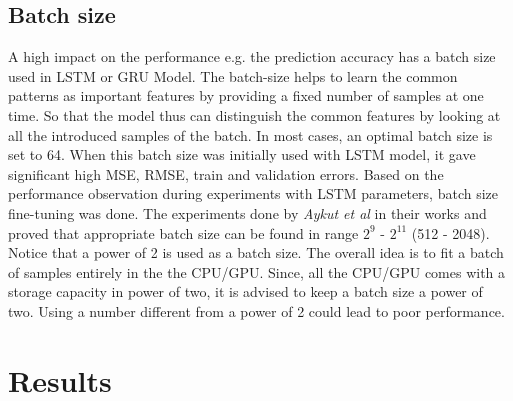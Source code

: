 \subsection{Batch size}
\label{sec:imp:experiments:batch}
A high impact on the performance e.g. the prediction accuracy has a batch size used in LSTM or GRU Model. The batch-size helps to learn the common patterns as important features by providing a fixed number of samples at one time. So that the model thus can distinguish the common features by looking at all the introduced samples of the batch. In most cases, an optimal batch size is set to 64. When this batch size was initially used with LSTM model, it gave significant high MSE, RMSE, train and validation errors. Based on the performance observation during experiments with LSTM parameters, batch size fine-tuning was done. The experiments done by \textit{Aykut et al} in their works \cite{delay_compensation_360} and \cite{telepresence} proved that appropriate batch size can be found in range $2^{9}$ - $2^{11}$ (512 - 2048). Notice that a power of 2 is used as a batch size. The overall idea is to fit a batch of samples entirely in the the CPU/GPU. Since, all the CPU/GPU comes with a storage capacity in power of two, it is advised to keep a batch size a power of two. Using a number different from a power of 2 could lead to poor performance.


\section{Results}
\label{sec:imp:results}
